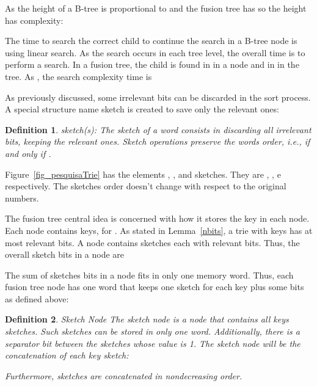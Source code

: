 \documentclass[11pt]{article}
\newtheorem{definicao}{Definition}
\newcommand{\sk}[1]{\mbox{\rm{sketch}}(#1)}
\begin{document}
As the height of a B-tree is proportional to  and the fusion tree has  so the height  has complexity:










The time to search the correct child to continue the search in a B-tree node is  using linear search. As the search occurs in each tree level, the overall time is   to perform a search. In a fusion tree, the child is found in 
 in a node and in  in the tree. As , the search complexity time is













As previously discussed, some irrelevant bits can be discarded in the sort process. A special structure name sketch is created to save only the relevant ones:



\begin{definicao}{\sk{s}:}
The sketch of a word  consists in discarding all irrelevant bits, keeping the relevant ones. Sketch operations preserve the words order, i.e.,  if and only if  . 
\end{definicao}

Figure~\ref{fig_pesquisaTrie} has the elements , ,  and  sketches. They are , ,  e  respectively. The sketches order doesn't change with respect to the original numbers.




The fusion tree central idea is concerned with how it stores the key in each node. Each node contains  keys, for . As stated in Lemma~\ref{nbits}, a trie with  keys has at most  relevant bits. A node contains  sketches each with  relevant bits. Thus, the overall sketch bits in a node are


The sum of sketches bits in a node fits in only one memory word. Thus, each fusion tree node has one word that keeps one sketch for each key plus some bits as defined above:




\begin{definicao}{Sketch Node}
The sketch node is a node that contains all keys sketches. Such sketches can be stored in only one word. Additionally, there is a separator bit between the sketches whose value is 1. The sketch node will be the concatenation of each key sketch:
 
Furthermore, sketches are concatenated in nondecreasing order.
\end{definicao}
\end{document}
